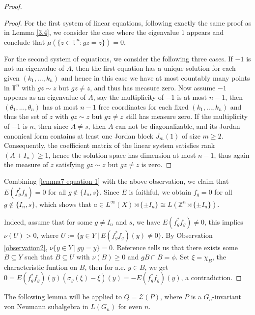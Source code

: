 \documentclass[12pt]{amsart}
\theoremstyle{definition}
\theoremstyle{remark}
\begin{document}
\begin{proof}
\begin{proof}
For the first system of linear equations, following exactly the same proof as in Lemma \ref{3.4}, we consider the case where the eigenvalue $1$ appears and conclude that  $ \mu(\{z\in \mathbb{T}^{n}:gz = z\})=0$.


For the second system of equations, we consider the following three cases. If $-1$ is not an eigenvalue of $A$, then the first equation has a unique solution for each given $(k_1,\dots,k_n)$ and hence in this case we have at most countably many points in $\mathbb{T}^n$ with $gz\sim z$ but $gz\ne z$, and thus has measure zero. Now assume $-1$ appears as an eigenvalue of $A$, say the multiplicity of $-1$ is at most $n-1$, then $(\theta_1,\dots,\theta_n)$ has at most $n-1$  free coordinates for each fixed $(k_1,\dots,k_n)$ and thus the set of $z$ with $gz\sim z$ but $gz\ne z$ still has measure zero. If the multiplicity of $-1$ is $n$, then since $A\ne s$, then $A$ can not be diagonalizable, and its Jordan canonical form contains at least one Jordan block $J_{m}(1)$ of size $m\ge 2$. Consequently, the coefficient matrix of the linear system satisfies rank $(A+I_n)\ge1$, hence the solution space has dimension at most $n-1$, thus again the measure  of $z$ satisfying $gz\sim z$ but $gz\ne z$ is zero.
\end{proof}
Combining  \eqref{lemma7 equation 1} with the above observation, we claim that $E(f^*_g f_g) = 0$ for all $g\not\in\{I_n, s\}$. Since $E$ is faithful, we obtain $f_g = 0$ for all $g\not\in\{I_n, s \}$, which shows that $a\in L^\infty(X) \rtimes \{\pm I_n\} \cong L(\mathbb{Z}^n \rtimes \{\pm I_n\})$.

Indeed, assume that for some $g\ne I_n$ and $s$, we have $E(f^*_g f_g) \ne 0 $, this implies $\nu(U)>0$, where $U:=\{y\in Y~|~E(f^*_g f_g)(y) \ne 0\}$. By Observation \ref{observation2}, $\nu\{y\in Y~|~gy=y\} = 0$. Reference \cite[Proposition 4.22]{dl} tells us that there exists some $B\subseteq Y$ such that $B\subseteq U$ with $\nu(B)\ge 0$ and $gB\cap B = \phi $. Set $\xi = \chi_{B}$, the characteristic funtion on $B$, then for a.e. $y\in B$, we get $0 = E(f^*_g f_g) (y)(\sigma_g(\xi)-\xi)(y)=-E(f^*_g f_g) (y)$, a contradiction.
\end{proof}

The following lemma will be applied to $Q=\mathcal{Z}(P)$, where $P$ is a $G_n$-invariant von Neumann subalgebra in $L(G_n)$ for even $n$.
\end{document}
